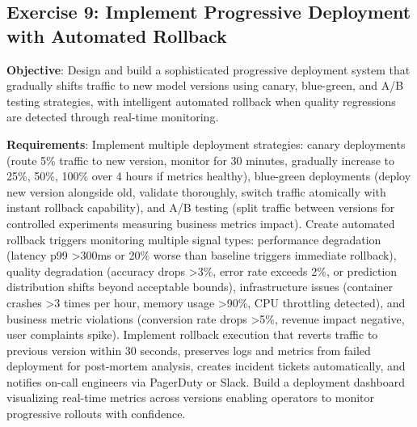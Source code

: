\subsection{Exercise 9: Implement Progressive Deployment with Automated Rollback}

\textbf{Objective}: Design and build a sophisticated progressive deployment system that gradually shifts traffic to new model versions using canary, blue-green, and A/B testing strategies, with intelligent automated rollback when quality regressions are detected through real-time monitoring.

\textbf{Requirements}: Implement multiple deployment strategies: canary deployments (route 5\% traffic to new version, monitor for 30 minutes, gradually increase to 25\%, 50\%, 100\% over 4 hours if metrics healthy), blue-green deployments (deploy new version alongside old, validate thoroughly, switch traffic atomically with instant rollback capability), and A/B testing (split traffic between versions for controlled experiments measuring business metrics impact). Create automated rollback triggers monitoring multiple signal types: performance degradation (latency p99 >300ms or 20\% worse than baseline triggers immediate rollback), quality degradation (accuracy drops >3\%, error rate exceeds 2\%, or prediction distribution shifts beyond acceptable bounds), infrastructure issues (container crashes >3 times per hour, memory usage >90\%, CPU throttling detected), and business metric violations (conversion rate drops >5\%, revenue impact negative, user complaints spike). Implement rollback execution that reverts traffic to previous version within 30 seconds, preserves logs and metrics from failed deployment for post-mortem analysis, creates incident tickets automatically, and notifies on-call engineers via PagerDuty or Slack. Build a deployment dashboard visualizing real-time metrics across versions enabling operators to monitor progressive rollouts with confidence.


